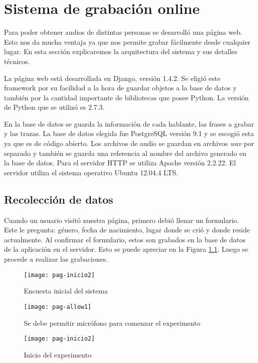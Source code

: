 \chapter{Sistema de grabación online}

Para poder obtener audios de distintas personas se desarrolló una página web. Esto nos da mucha ventaja ya que nos permite grabar fácilmente desde cualquier lugar. En esta sección explicaremos la arquitectura del sistema y sus detalles técnicos.

La página web está desarrollada en Django, versión 1.4.2. Se eligió este framework por su facilidad a la hora de guardar objetos a la base de datos y también por la cantidad importante de bibliotecas que posee Python. La versión de Python que se utilizó es 2.7.3. 

En la base de datos se guarda la información de cada hablante, las frases a grabar y las trazas. La base de datos elegida fue PostgreSQL versión 9.1 y se escogió esta ya que es de código abierto. Los archivos de audio se guardan en archivos \textit{wav} por separado y también se guarda una referencia al nombre del archivo generado en la base de datos. Para el servidor HTTP se utiliza Apache versión 2.2.22. El servidor utiliza el sistema operativo Ubuntu 12.04.4 LTS.

\section{Recolección de datos}

Cuando un usuario visitó nuestra página, primero debió llenar un formulario. Este le pregunta: género, fecha de nacimiento, lugar donde se crió y donde reside actualmente. Al confirmar el formulario, estos son grabados en la base de datos de la aplicación en el servidor. Esto se puede apreciar en la Figura \ref{figEncuesta}. Luego se procede a realizar las grabaciones. 

\begin{figure}[h!]
    \centerline{\texttt{[image: pag-inicio2]} }
    \caption{Encuesta inicial del sistema}
    \label{figEncuesta}
\end{figure}

\begin{figure}[h!]
    \centerline{\texttt{[image: pag-allow1]} }
    \caption{Se debe permitir micrófono para comenzar el experimento}
    \label{allowmic}
\end{figure}

\begin{figure}[h!]
    \centerline{\texttt{[image: pag-inicio2]} }
    \caption{Inicio del experimento}
    \label{inicio}
\end{figure}

